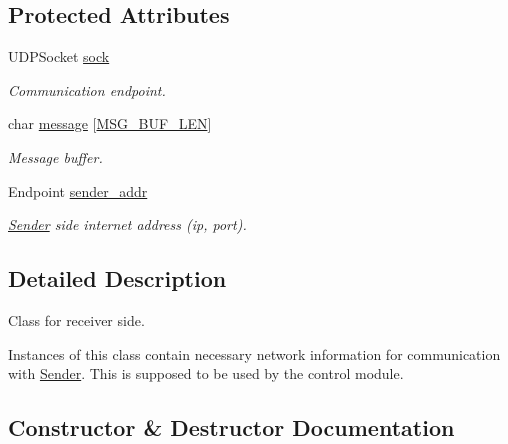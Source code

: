 \subsection*{Protected Attributes}
\begin{DoxyCompactItemize}
\item 
U\+D\+P\+Socket \hyperlink{classReceiver_a54d729b5fefa143500429505375efd68}{sock}\hypertarget{classReceiver_a54d729b5fefa143500429505375efd68}{}\label{classReceiver_a54d729b5fefa143500429505375efd68}

\begin{DoxyCompactList}\small\item\em Communication endpoint. \end{DoxyCompactList}\item 
char \hyperlink{classReceiver_ac784703497512ca4ac8bfb533ffba77b}{message} \mbox{[}\hyperlink{protocol_8h_abd55521187de5f99b96a34c3acc93ac1}{M\+S\+G\+\_\+\+B\+U\+F\+\_\+\+L\+EN}\mbox{]}\hypertarget{classReceiver_ac784703497512ca4ac8bfb533ffba77b}{}\label{classReceiver_ac784703497512ca4ac8bfb533ffba77b}

\begin{DoxyCompactList}\small\item\em Message buffer. \end{DoxyCompactList}\item 
Endpoint \hyperlink{classReceiver_a94cc9b9a270087ba74c1585978cab38f}{sender\+\_\+addr}\hypertarget{classReceiver_a94cc9b9a270087ba74c1585978cab38f}{}\label{classReceiver_a94cc9b9a270087ba74c1585978cab38f}

\begin{DoxyCompactList}\small\item\em \hyperlink{classSender}{Sender} side internet address (ip, port). \end{DoxyCompactList}\end{DoxyCompactItemize}


\subsection{Detailed Description}
Class for receiver side.

Instances of this class contain necessary network information for communication with \hyperlink{classSender}{Sender}. This is supposed to be used by the control module. 

\subsection{Constructor \& Destructor Documentation}
